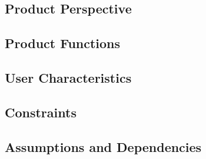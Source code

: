 \subsection{Product Perspective}
\label{description:perspective}


\subsection{Product Functions}
\label{description:functions}


\subsection{User Characteristics}
\label{description:userchar}


\subsection{Constraints}
\label{description:constraints}


\subsection{Assumptions and Dependencies}
\label{description:assumptions}


